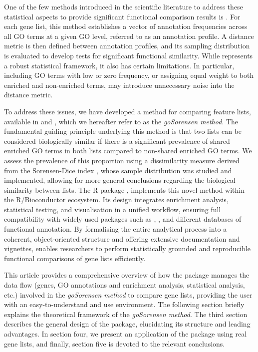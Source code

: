 One of the few methods introduced in the scientific literature to address these statistical aspects to provide significant functional comparison results is . For each gene list, this method establishes a vector of annotation frequencies across all GO terms at a given GO level, referred to as an annotation profile. A distance metric is then defined between annotation profiles, and its sampling distribution is evaluated to develop tests for significant functional similarity. While  represents a robust statistical framework, it also has certain limitations. In particular, including GO terms with low or zero frequency, or assigning equal weight to both enriched and non-enriched terms, may introduce unnecessary noise into the distance metric.

To address these issues, we have developed a method for comparing feature lists, available in \citet{phdThesisPabloFlores} and \citet{flores2022equivalence}, which we hereafter refer to as the \emph{goSorensen method}. The fundamental guiding principle underlying this method is that two lists can be considered biologically similar if there is a significant prevalence of shared enriched GO terms in both lists compared to non-shared enriched GO terms. We assess the prevalence of this proportion using a dissimilarity measure derived from the Sorensen-Dice index \citep{sorensen1948method}, whose sample distribution was studied and implemented, allowing for more general conclusions regarding the biological similarity between lists. The  R package \citep{goSorensenRPackage}, implements this novel method within the R/Bioconductor ecosystem. Its design integrates enrichment analysis, statistical testing, and visualisation in a unified workflow, ensuring full compatibility with widely used packages such as  \citep{clusterProfiler1},  \citep{goProfiles}, and different databases of functional annotation. By formalising the entire analytical process into a coherent, object-oriented structure and offering extensive documentation and vignettes,  enables researchers to perform statistically grounded and reproducible functional comparisons of gene lists efficiently.

This article provides a comprehensive overview of how the  package manages the data flow (genes, GO annotations and enrichment analysis, statistical analysis, etc.) involved in the \emph{goSorensen method} to compare gene lists, providing the user with an easy-to-understand and use environment. The following section briefly explains the theoretical framework of the \emph{goSorensen method}. The third section describes the general design of the package, elucidating its structure and leading advantages. In section four, we present an application of the package using real gene lists, and finally, section five is devoted to the relevant conclusions.


